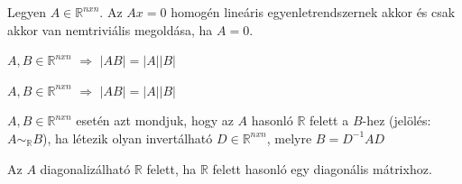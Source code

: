 	\begin{frame}
		\begin{tcolorbox}[title={Tétel: Egyenletrendszer megoldása, determináns}]
			Legyen $A \in \mathbb{R}^{n x n}$. Az $Ax = 0$ homogén lineáris egyenletrendszernek akkor és csak akkor van nemtriviális megoldása, ha $A = 0$.
		\end{tcolorbox}	
		
		\begin{tcolorbox}[title={Tétel: Szorzástétel}]
			$A, B \in \mathbb{R}^{n x n}$ $\Rightarrow$ $|AB| = |A| |B|$
		\end{tcolorbox}	
		
		\begin{tcolorbox}[title={Tétel: Szorzástétel}]
			$A, B \in \mathbb{R}^{n x n}$ $\Rightarrow$ $|AB| = |A| |B|$
		\end{tcolorbox}	
		
		\begin{tcolorbox}[title={Def.: Hasonlóság}]
			$A, B \in \mathbb{R}^{n x n}$ esetén azt mondjuk, hogy az $A$ hasonló $\mathbb{R}$ felett a $B$-hez (jelölés: $A {\sim}_{\mathbb{R}} B$), ha létezik olyan invertálható $D \in \mathbb{R}^{n x n}$, melyre $B = D^{-1}AD$
		\end{tcolorbox}	
		
		\begin{tcolorbox}[title={Def.: Diagonizáció}]
			Az $A$ diagonalizálható $\mathbb{R}$ felett, ha $\mathbb{R}$ felett hasonló egy diagonális mátrixhoz.
		\end{tcolorbox}	
	\end{frame}
	
